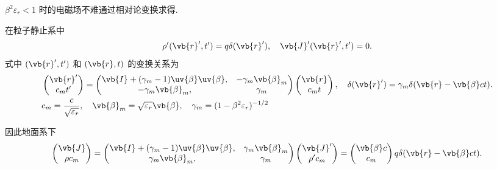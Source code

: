 \begin{note}
	\(\beta^{2} \varepsilon_{r} < 1\) 时的电磁场不难通过相对论变换求得.

	在粒子静止系中
	\begin{align*}
		\rho'(\vb{r}', t') = q \delta(\vb{r}'), \quad
		\vb{J}'(\vb{r}', t') = 0.
	\end{align*}
	式中 \((\vb{r}', t')\) 和 \((\vb{r}, t)\) 的变换关系为
	\begin{align*}
		&\begin{pmatrix}
			\vb{r}' \\
			c_{m} t'
		\end{pmatrix} =
		\begin{pmatrix}
			\vb{I} + (\gamma_{m} - 1) \uv{\beta} \uv{\beta}, & -\gamma_{m} \vb{\beta}_{m} \\
			-\gamma_{m} \vb{\beta}_{m},                      & \gamma_{m}
		\end{pmatrix}
		\begin{pmatrix}
			\vb{r} \\
			c_{m} t
		\end{pmatrix}, \quad
		\delta(\vb{r}') = \gamma_{m} \delta(\vb{r} - \vb{\beta} c t).\\
		&c_{m} = \frac{c}{\sqrt{\varepsilon_{r}}}, \quad \vb{\beta}_{m} = \sqrt{\varepsilon_{r}} \vb{\beta}, \quad \gamma_{m} = (1 - \beta^{2} \varepsilon_{r})^{-1/2}
	\end{align*}

	因此地面系下
	\begin{align*}
		\begin{pmatrix}
			\vb{J} \\
			\rho c_{m}
		\end{pmatrix} =
		\begin{pmatrix}
			\vb{I} + (\gamma_{m} - 1) \uv{\beta} \uv{\beta}, & \gamma_{m} \vb{\beta}_{m} \\
			\gamma_{m} \vb{\beta}_{m},                       & \gamma_{m}
		\end{pmatrix}
		\begin{pmatrix}
			\vb{J}' \\
			\rho' c_{m}
		\end{pmatrix}
		=
		\begin{pmatrix}
			\vb{\beta} c \\
			c_{m}
		\end{pmatrix} q \delta(\vb{r} - \vb{\beta} c t).
	\end{align*}


\end{note}
